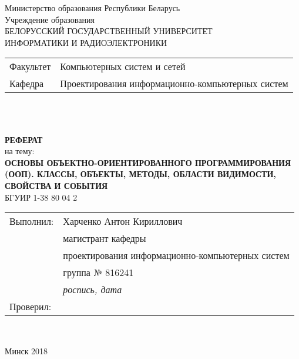 \begin{titlepage}
  \begin{center}
    Министерство образования Республики Беларусь\\[1em]
    Учреждение образования\\
    БЕЛОРУССКИЙ ГОСУДАРСТВЕННЫЙ УНИВЕРСИТЕТ \\
    ИНФОРМАТИКИ И РАДИОЭЛЕКТРОНИКИ\\[1em]

    \begin{minipage}{\textwidth}
      \begin{flushleft}
        \begin{tabular}{ l l }
          Факультет & Компьютерных систем и сетей\\
          Кафедра   & Проектирования информационно-компьютерных систем
        \end{tabular}
      \end{flushleft}
    \end{minipage}\\[3em]

	\begin{minipage}{0.4\textwidth}
		
	\end{minipage}\\[2.2em]

    \textbf{РЕФЕРАТ}\\
    {на тему:}\\[1em]
    \textbf{\large\MakeUppercase{Основы объектно-ориентированного программирования (ООП). Классы, объекты, методы, области видимости, свойства и события}}\\[1em]

    {БГУИР 1-38 80 04 2}\\[2em]
    
    \begin{flushright}
      \begin{minipage}{0.4\textwidth}
        \begin{tabular}{ l l }
          Выполнил: & Харченко Антон Кириллович\\
          & магистрант кафедры\\
          & проектирования информационно-компьютерных систем\\
          & группа № 816241\\
          & \underline{\hspace*{2.8cm}} \textit{роспись, дата}\\
          Проверил: & \\
        \end{tabular}
      \end{minipage}\\[2.2em]
    \end{flushright}
    
    \vfill
    {\normalsize Минск 2018}
  \end{center}
\end{titlepage}